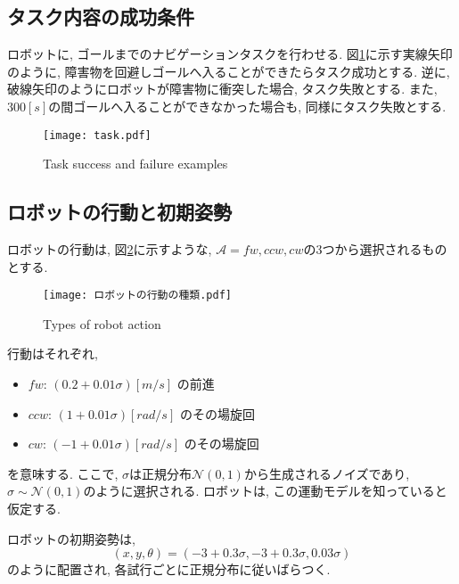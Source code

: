 \subsection{タスク内容の成功条件}
ロボットに, ゴールまでのナビゲーションタスクを行わせる. 
図\ref{fig:task}に示す実線矢印のように, 障害物を回避しゴールへ入ることができたらタスク成功とする. 
逆に, 破線矢印のようにロボットが障害物に衝突した場合, タスク失敗とする. 
また, $300[\si{s}]$の間ゴールへ入ることができなかった場合も, 同様にタスク失敗とする. 

\begin{figure}[h]
  \begin{center}
    \texttt{[image: task.pdf]}
    \caption{Task success and failure examples}
    \label{fig:task}
  \end{center}
\end{figure}

\subsection{ロボットの行動と初期姿勢}
ロボットの行動は, 図\ref{fig:ロボットの行動の種類}に示すような, 
$\mathcal{A} = { fw, ccw, cw }$の3つから選択されるものとする. 

\begin{figure}[h]
  \begin{center}
    \texttt{[image: ロボットの行動の種類.pdf]}
    \caption{Types of robot action}
    \label{fig:ロボットの行動の種類}
  \end{center}
\end{figure}

行動はそれぞれ, 
\begin{itemize}
  \item $fw$: $(0.2 + 0.01\sigma) \si{[m/s]}$ の前進
  \item $ccw$: $(1 + 0.01\sigma) \si{[rad/s]}$ のその場旋回
  \item $cw$: $(-1 + 0.01\sigma) \si{[rad/s]}$ のその場旋回
\end{itemize}
を意味する. 
ここで, $\sigma$は正規分布$\mathcal{N}(0, 1)$から生成されるノイズであり, $\sigma \sim \mathcal{{N}}(0, 1)$のように選択される. 
ロボットは, この運動モデルを知っていると仮定する. 

ロボットの初期姿勢は, 
\begin{equation}
\label{robot initial pose}
  (x, y, \theta) = (-3 + 0.3\sigma, -3 + 0.3\sigma, 0.03\sigma)
\end{equation}
のように配置され, 各試行ごとに正規分布に従いばらつく. 


